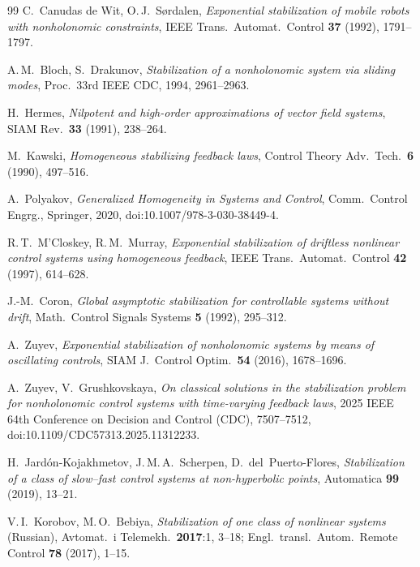 \documentclass[11pt,reqno]{amsart}
\theoremstyle{plain}
\theoremstyle{definition}
\theoremstyle{remark}
\begin{document}
\begin{thebibliography}{99}
 C.~Canudas de Wit, O.\,J.~S\o rdalen,
  \emph{Exponential stabilization of mobile robots with nonholonomic constraints},
  IEEE Trans.\ Automat.\ Control \textbf{37} (1992), 1791--1797.

 A.\,M.~Bloch, S.~Drakunov,
  \emph{Stabilization of a nonholonomic system via sliding modes},
  Proc.\ 33rd IEEE CDC, 1994, 2961--2963.

 H.~Hermes,
  \emph{Nilpotent and high-order approximations of vector field systems},
  SIAM Rev.\ \textbf{33} (1991), 238--264.

 M.~Kawski,
  \emph{Homogeneous stabilizing feedback laws},
  Control Theory Adv.\ Tech.\ \textbf{6} (1990), 497--516.

 A.~Polyakov,
  \emph{Generalized Homogeneity in Systems and Control}, Comm.\ Control Engrg., Springer, 2020,
  doi:10.1007/978-3-030-38449-4.

 R.\,T.~M'Closkey, R.\,M.~Murray,
  \emph{Exponential stabilization of driftless nonlinear control systems using
  homogeneous feedback}, IEEE Trans.\ Automat.\ Control \textbf{42} (1997), 614--628.

 J.-M.~Coron,
  \emph{Global asymptotic stabilization for controllable systems without drift},
  Math.\ Control Signals Systems \textbf{5} (1992), 295--312.

 A.~Zuyev,
  \emph{Exponential stabilization of nonholonomic systems by means of oscillating controls},
  SIAM J.\ Control Optim.\ \textbf{54} (2016), 1678--1696.

 A.~Zuyev, V.~Grushkovskaya,
  \emph{On classical solutions in the stabilization problem for nonholonomic control systems with
  time-varying feedback laws}, 2025 IEEE 64th Conference on Decision and Control (CDC), 7507--7512,
  doi:10.1109/CDC57313.2025.11312233.

 H.~Jard\'on-Kojakhmetov, J.\,M.\,A.~Scherpen, D.~del~Puerto-Flores,
  \emph{Stabilization of a class of slow--fast control systems at non-hyperbolic points},
  Automatica \textbf{99} (2019), 13--21.

 V.\,I.~Korobov, M.\,O.~Bebiya,
  \emph{Stabilization of one class of nonlinear systems} \textup{(Russian)},
  Avtomat.\ i Telemekh.\ \textbf{2017}:1, 3--18; Engl.\ transl.\ Autom.\ Remote
  Control \textbf{78} (2017), 1--15.


\end{thebibliography}
\end{document}
